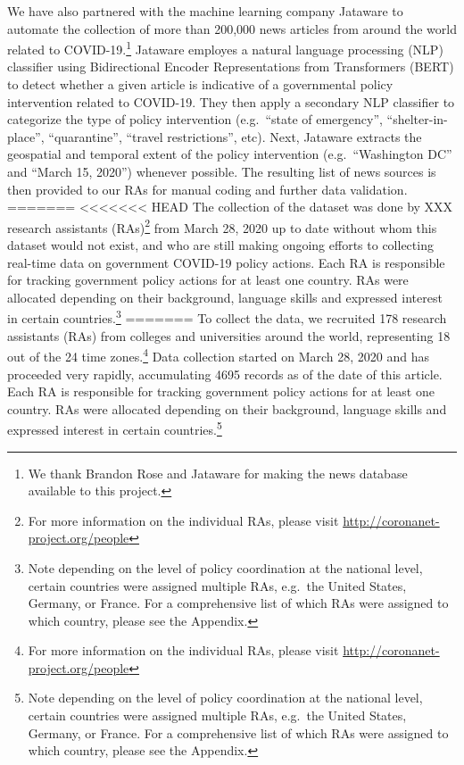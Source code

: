 \documentclass[]{article}
\let\rmarkdownfootnote\footnote%
\def\footnote{\protect\rmarkdownfootnote}
\begin{document}
We have also partnered with the machine learning company Jataware to automate the collection of more than 200,000 news articles from around the world related to COVID-19.\footnote{We thank Brandon Rose and Jataware for making the news database available to this project.} Jataware employes a natural language processing (NLP) classifier using Bidirectional Encoder Representations from Transformers (BERT) to detect whether a given article is indicative of a governmental policy intervention related to COVID-19. They then apply a secondary NLP classifier to categorize the type of policy intervention (e.g.~``state of emergency'', ``shelter-in-place'', ``quarantine'', ``travel restrictions'', etc). Next, Jataware extracts the geospatial and temporal extent of the policy intervention (e.g.~``Washington DC'' and ``March 15, 2020'') whenever possible. The resulting list of news sources is then provided to our RAs for manual coding and further data validation.
=======
<<<<<<< HEAD
The collection of the dataset was done by XXX research assistants (RAs)\footnote{For more information on the individual RAs, please visit \url{http://coronanet-project.org/people} } from March 28, 2020 up to date without whom this dataset would not exist, and who are still making ongoing efforts to collecting real-time data on government COVID-19 policy actions. Each RA is responsible for tracking government policy actions for at least one country. RAs were allocated depending on their background, language skills and expressed interest in certain countries.\footnote{Note depending on the level of policy coordination at the national level, certain countries were assigned multiple RAs, e.g.~the United States, Germany, or France. For a comprehensive list of which RAs were assigned to which country, please see the Appendix.}
=======
To collect the data, we recruited 178 research assistants (RAs) from colleges and universities around the world, representing 18 out of the 24 time zones.\footnote{For more information on the individual RAs, please visit \url{http://coronanet-project.org/people}} Data collection started on March 28, 2020 and has proceeded very rapidly, accumulating 4695 records as of the date of this article. Each RA is responsible for tracking government policy actions for at least one country. RAs were allocated depending on their background, language skills and expressed interest in certain countries.\footnote{Note depending on the level of policy coordination at the national level, certain countries were assigned multiple RAs, e.g.~the United States, Germany, or France. For a comprehensive list of which RAs were assigned to which country, please see the Appendix.}
\end{document}
